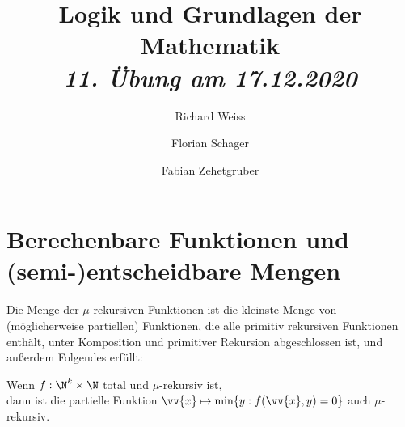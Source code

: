 \documentclass{article}
\title
{
  Logik und Grundlagen der Mathematik \\
  \vspace{4pt}
  \normalsize
  \textit{11. Übung am 17.12.2020}
}
\author
{
  Richard Weiss
  \and
  Florian Schager
  \and
  Fabian Zehetgruber
}
\date{}
\begin{document}
\maketitle

\section*{Berechenbare Funktionen und (semi-)entscheidbare Mengen}

Die Menge der $\mu$-rekursiven Funktionen ist die kleinste Menge von (möglicherweise partiellen)
Funktionen, die alle primitiv rekursiven Funktionen enthält, unter Komposition und
primitiver Rekursion abgeschlossen ist, und außerdem Folgendes erfüllt:

\begin{adjustwidth}{1cm}{}
Wenn $f: \N^k \times \N$ total und $\mu$-rekursiv ist, \\
dann ist die partielle Funktion $\vv{x} \mapsto \min\{y: f(\vv{x},y) = 0\}$ auch
$\mu$-rekursiv.
\end{adjustwidth}









\end{document}
